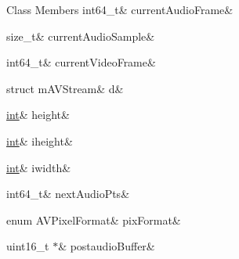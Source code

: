 \begin{DoxyFields}{Class Members}
\mbox{\label{ffmpeg-encoder_8h_aae6bedff95334d63fb30383d9361be71}} 
int64\_t&
currentAudioFrame&
\\
\hline

\mbox{\label{ffmpeg-encoder_8h_ac4d537c3f5e42c2ce6a268fee7ba10a6}} 
size\_t&
currentAudioSample&
\\
\hline

\mbox{\label{ffmpeg-encoder_8h_ac5544b4dbf768ddf7c99c220c3e8c68c}} 
int64\_t&
currentVideoFrame&
\\
\hline

\mbox{\label{ffmpeg-encoder_8h_a91ba26c58c7a676ef8c4d874b60b403a}} 
struct mAVStream&
d&
\\
\hline

\mbox{\label{ffmpeg-encoder_8h_a25bac014356797591514c3d4c9d488cb}} 
\mbox{\hyperlink{ioapi_8h_a787fa3cf048117ba7123753c1e74fcd6}{int}}&
height&
\\
\hline

\mbox{\label{ffmpeg-encoder_8h_ae0b61e4e27e1485f5210125e9836fee5}} 
\mbox{\hyperlink{ioapi_8h_a787fa3cf048117ba7123753c1e74fcd6}{int}}&
iheight&
\\
\hline

\mbox{\label{ffmpeg-encoder_8h_ad5bbb05df4c1a3c28bc92e73e39002cb}} 
\mbox{\hyperlink{ioapi_8h_a787fa3cf048117ba7123753c1e74fcd6}{int}}&
iwidth&
\\
\hline

\mbox{\label{ffmpeg-encoder_8h_a30fba59969fa5c4e4b24da31381bf6b0}} 
int64\_t&
nextAudioPts&
\\
\hline

\mbox{\label{ffmpeg-encoder_8h_afafa8dd5e905ca9522e477c28c1848fc}} 
enum AVPixelFormat&
pixFormat&
\\
\hline

\mbox{\label{ffmpeg-encoder_8h_a29a5d5b6c7a29e4e0b0d2dc37058068a}} 
uint16\_t $\ast$&
postaudioBuffer&
\\
\hline


\end{DoxyFields}
